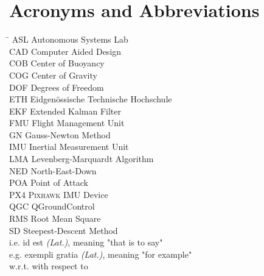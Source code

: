 \section*{Acronyms and Abbreviations}

\begin{tabbing}
 \hspace*{1.6cm}  \= \kill
 ASL \> Autonomous Systems Lab \\[0.5ex]
 CAD \> Computer Aided Design \\[0.5ex]
 COB \> Center of Buoyancy \\[0.5ex]
 COG \> Center of Gravity \\[0.5ex]
 DOF \> Degrees of Freedom\\[0.5ex]
 ETH \> Eidgenössische Technische Hochschule \\[0.5ex]
 EKF \> Extended Kalman Filter \\[0.5ex]
 FMU \> Flight Management Unit \\[0.5ex]
 GN  \> Gauss-Newton Method \\[0.5ex]
 IMU \> Inertial Measurement Unit \\[0.5ex]
 LMA \> Levenberg-Marquardt Algorithm \\[0.5ex]
 NED \> North-East-Down \\[0.5ex]
 POA \> Point of Attack \\[0.5ex]
 PX4 \> \textsc{Pixhawk} IMU Device \\[0.5ex]
 QGC \> QGroundControl \\[0.5ex]
 RMS \> Root Mean Square\\[0.5ex]
 SD  \> Steepest-Descent Method \\[0.5ex]
 i.e.   \> id est \textit{(Lat.)}, meaning "that is to say" \\[0.5ex]
 e.g.   \> exempli gratia \textit{(Lat.)}, meaning "for example" \\[0.5ex]
 w.r.t. \> with respect to \\[0.5ex]
 
\end{tabbing}